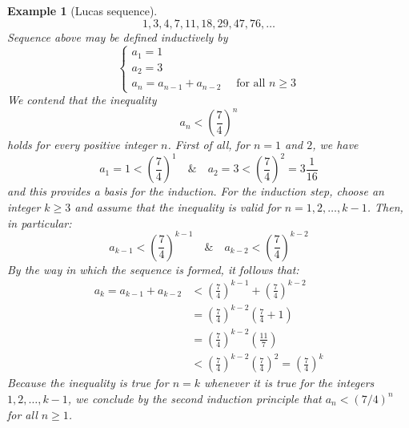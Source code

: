 \documentclass[atbegshi, chapter]{memoir}
\newtheorem{exm}[thm]{Example}
\begin{document}
\begin{exm}[Lucas sequence]\normalfont
  \[
    1,3,4,7,11,18,29,47,76,\ldots
  \]
  Sequence above may be defined inductively by
  \[
    \begin{cases}
      a_1 = 1 \\
      a_2 = 3 \\
      a_n = a_{n-1}+a_{n-2}\quad\textrm{ for all }n\geq 3
    \end{cases}
  \]
  We contend that the inequality
  \[
    a_n < \left(\frac{7}{4}\right)^n
  \]
  holds for every positive integer $n$. First of all, for $n=1$ and $2$, we
  have
  \[
    a_1 = 1 < \left(\frac{7}{4}\right)^1\quad\&\quad
    a_2 = 3 < \left(\frac{7}{4}\right)^2 = 3\frac{1}{16}
  \]
  and this provides a basis for the induction. For the induction step,
  choose an integer $k\geq3$ and assume that the inequality is valid
  for $n=1,2,\ldots,k-1$. Then, in particular:
  \[
    a_{k-1}<\left(\frac{7}{4}\right)^{k-1}\quad\&\quad
    a_{k-2}<\left(\frac{7}{4}\right)^{k-2}
  \]
  By the way in which the sequence is formed, it follows that:
  \begin{align*}
    a_k = a_{k-1}+a_{k-2}
    &< \left(\frac{7}{4}\right)^{k-1}+\left(\frac{7}{4}\right)^{k-2} \\
    &= \left(\frac{7}{4}\right)^{k-2}\left(\frac{7}{4}+1\right)\\
    &=\left(\frac{7}{4}\right)^{k-2}\left(\frac{11}{7}\right)\\
    &<\left(\frac{7}{4}\right)^{k-2}\left(\frac{7}{4}\right)^{2}
    =\left(\frac{7}{4}\right)^{k}
  \end{align*}
  Because the inequality is true for $n=k$ whenever it is true for the
  integers $1,2,\ldots,k-1$, we conclude by the second induction principle
  that $a_n<(7/4)^n$ for all $n\geq 1$.
\end{exm}
\end{document}
